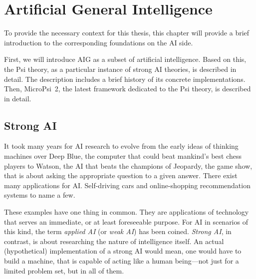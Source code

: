 


\chapter{Artificial General Intelligence}
\label{chap:2}
To provide the necessary context for this thesis, this chapter will provide a brief introduction to the corresponding foundations on the AI side.


First, we will introduce AIG as a subset of artificial intelligence. Based on this, the Psi theory, as a particular instance of strong AI theories, is described in detail. The description includes a brief history of its concrete implementations. Then, MicroPsi~2, the latest framework dedicated to the Psi theory, is described in detail.

    \section{Strong AI}
    
    
It took many years for AI research to evolve from the early ideas of thinking machines over Deep Blue, the computer that could beat mankind's best chess players to Watson, the AI that beats the champions of Jeopardy, the game show, that is about asking the appropriate question to a given answer. There exist many applications for AI. Self-driving cars and online-shopping recommendation systems to name a few.


These examples have one thing in common. They are applications of technology that serves an immediate, or at least foreseeable purpose. For AI in scenarios of this kind, the term \emph{applied AI} (or \emph{weak AI}) has been coined. \emph{Strong AI}, in contrast, is about researching the nature of intelligence itself. An actual (hypothetical) implementation of a strong AI would mean, one would have to build a machine, that is capable of acting like a human being---not just for a limited problem set, but in all of them. 

